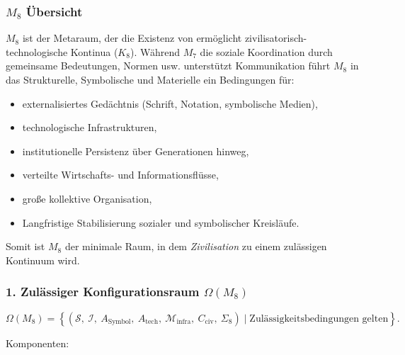

\subsubsection{\texorpdfstring{$M_8$}{M_8} Übersicht}
\label{sec:m8-overview}

$M_8$ ist der Metaraum, der die Existenz von ermöglicht
zivilisatorisch-technologische Kontinua ($K_8$).
Während $M_7$ die soziale Koordination durch gemeinsame Bedeutungen, Normen usw. unterstützt
Kommunikation führt $M_8$ in das Strukturelle, Symbolische und Materielle ein
Bedingungen für:

\begin{itemize}
    \item externalisiertes Gedächtnis (Schrift, Notation, symbolische Medien),
    \item technologische Infrastrukturen,
    \item institutionelle Persistenz über Generationen hinweg,
    \item verteilte Wirtschafts- und Informationsflüsse,
    \item große kollektive Organisation,
    \item Langfristige Stabilisierung sozialer und symbolischer Kreisläufe.
\end{itemize}

Somit ist $M_8$ der minimale Raum, in dem \emph{Zivilisation} zu einem zulässigen Kontinuum wird.

\subsubsection*{1. Zulässiger Konfigurationsraum \texorpdfstring{$\Omega(M_8)$}{\Omega(M_8)}}

\[
\Omega(M_8)=
\left\{
(
\mathcal{S},\
\mathcal{I},\
A_{\mathrm{Symbol}},\
A_{\mathrm{tech}},\
\mathcal{M}_{\mathrm{infra}},\
C_{\mathrm{civ}},\
\Sigma_8
)
\mid \text{Zulässigkeitsbedingungen gelten}
\right\}.
\]

Komponenten:

